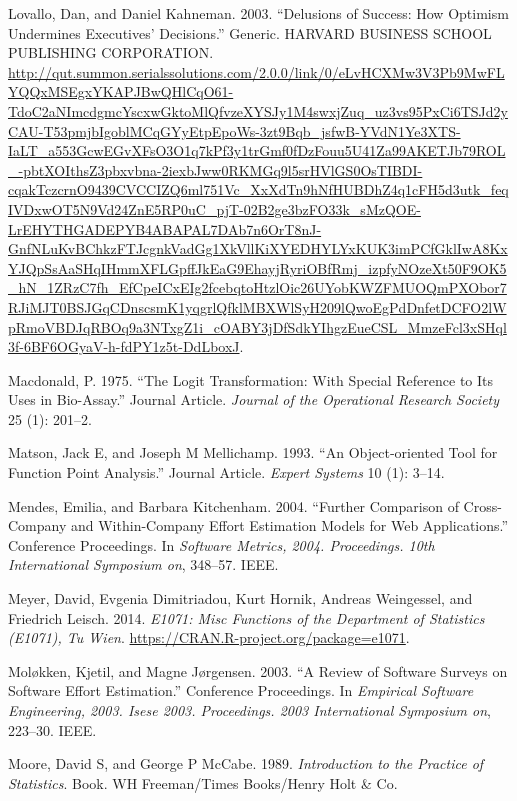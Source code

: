 \documentclass[]{elsarticle} %
\begin{document}
\hypertarget{ref-Lovallo2003}{}
Lovallo, Dan, and Daniel Kahneman. 2003. ``Delusions of Success: How
Optimism Undermines Executives' Decisions.'' Generic. HARVARD BUSINESS
SCHOOL PUBLISHING CORPORATION.
\url{http://qut.summon.serialssolutions.com/2.0.0/link/0/eLvHCXMw3V3Pb9MwFLYQQxMSEgxYKAPJBwQHlCqO61-TdoC2aNImcdgmcYscxwGktoMlQfvzeXYSJy1M4swxjZuq_uz3vs95PxCi6TSJd2yCAU-T53pmjbIgoblMCqGYyEtpEpoWs-3zt9Bqb_jsfwB-YVdN1Ye3XTS-IaLT_a553GcwEGvXFsO3O1q7kPf3y1trGmf0fDzFouu5U41Za99AKETJb79ROL_-pbtXOIthsZ3pbxvbna-2iexbJww0RKMGq9l5srHVlGS0OsTIBDI-cqakTczcrnO9439CVCCIZQ6ml751Vc_XxXdTn9hNfHUBDhZ4q1cFH5d3utk_feqIVDxwOT5N9Vd24ZnE5RP0uC_pjT-02B2ge3bzFO33k_sMzQOE-LrEHYTHGADEPYB4ABAPAL7DAb7n6OrT8nJ-GnfNLuKvBChkzFTJcgnkVadGg1XkVllKiXYEDHYLYxKUK3imPCfGklIwA8KxYJQpSsAaSHqIHmmXFLGpffJkEaG9EhayjRyriOBfRmj_izpfyNOzeXt50F9OK5_hN_1ZRzC7fh_EfCpeICxEIg2fcebqtoHtzlOic26UYobKWZFMUOQmPXObor7RJiMJT0BSJGqCDnscsmK1yqgrlQfklMBXWlSyH209lQwoEgPdDnfetDCFO2lWpRmoVBDJqRBOq9a3NTxgZ1i_cOABY3jDfSdkYIhgzEueCSL_MmzeFcl3xSHql3f-6BF6OGyaV-h-fdPY1z5t-DdLboxJ}.

\hypertarget{ref-Macdonald1975}{}
Macdonald, P. 1975. ``The Logit Transformation: With Special Reference
to Its Uses in Bio-Assay.'' Journal Article. \emph{Journal of the
Operational Research Society} 25 (1): 201--2.

\hypertarget{ref-Matson1993}{}
Matson, Jack E, and Joseph M Mellichamp. 1993. ``An Object‐oriented Tool
for Function Point Analysis.'' Journal Article. \emph{Expert Systems} 10
(1): 3--14.

\hypertarget{ref-Mendes2004}{}
Mendes, Emilia, and Barbara Kitchenham. 2004. ``Further Comparison of
Cross-Company and Within-Company Effort Estimation Models for Web
Applications.'' Conference Proceedings. In \emph{Software Metrics, 2004.
Proceedings. 10th International Symposium on}, 348--57. IEEE.

\hypertarget{ref-e1071}{}
Meyer, David, Evgenia Dimitriadou, Kurt Hornik, Andreas Weingessel, and
Friedrich Leisch. 2014. \emph{E1071: Misc Functions of the Department of
Statistics (E1071), Tu Wien}.
\url{https://CRAN.R-project.org/package=e1071}.

\hypertarget{ref-Molokken2003}{}
Moløkken, Kjetil, and Magne Jørgensen. 2003. ``A Review of Software
Surveys on Software Effort Estimation.'' Conference Proceedings. In
\emph{Empirical Software Engineering, 2003. Isese 2003. Proceedings.
2003 International Symposium on}, 223--30. IEEE.

\hypertarget{ref-Moore1989}{}
Moore, David S, and George P McCabe. 1989. \emph{Introduction to the
Practice of Statistics}. Book. WH Freeman/Times Books/Henry Holt \& Co.
\end{document}
